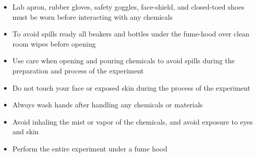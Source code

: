 \begin{center} %
    \begin{framed} %
        \begin{minipage}{0.8\textwidth} %
            \raggedright %
            \setcounter{mpsection}{3}
            \begin{itemize}
                \item Lab apron, rubber gloves, safety goggles, face-shield, and closed-toed shoes must be worn before interacting with any chemicals
                \item To avoid spills ready all beakers and bottles under the fume-hood over clean room wipes before opening
                \item Use care when opening and pouring chemicals to avoid spills during the preparation and process of the experiment
                \item Do not touch your face or exposed skin during the process of the experiment
                \item Always wash hands after handling any chemicals or materials
                \item Avoid inhaling the mist or vapor of the chemicals, and avoid exposure to eyes and skin
                \item Perform the entire experiment under a fume hood
            \end{itemize}
        \end{minipage}
    \end{framed}
\end{center}


